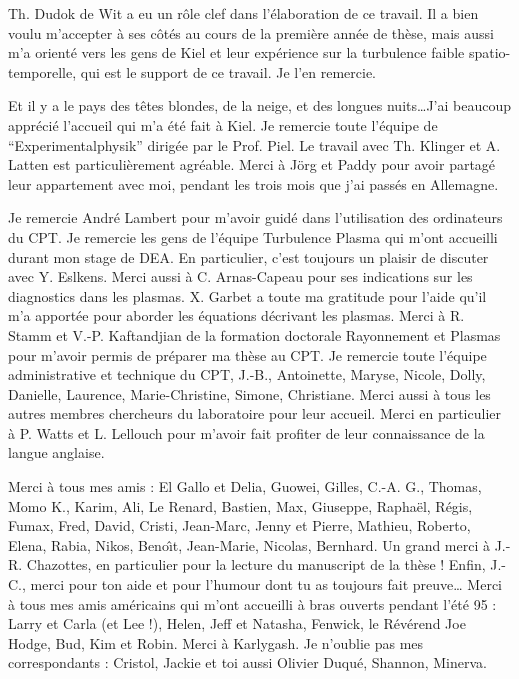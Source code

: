 \documentclass{book}
\begin{document}
Th. Dudok de Wit a eu un r\^ole clef dans l'\'elaboration de ce
travail. Il a bien voulu m'accepter \`a ses c\^ot\'es au cours de la
premi\`ere ann\'ee de th\`ese, mais aussi m'a orient\'e vers les gens
de Kiel et leur exp\'erience sur la turbulence faible
spatio-temporelle, qui est le support de ce travail. Je l'en
remercie. 

Et il y a le pays des t\^etes blondes, de la neige, et des
longues nuits\dots J'ai beaucoup appr\'eci\'e l'accueil qui m'a
\'et\'e fait \`a Kiel. Je 
remercie toute l'\'equipe de ``Experimentalphysik'' dirig\'ee par le
Prof. Piel. Le travail avec Th. Klinger et A. Latten est
particuli\`erement agr\'eable.
Merci \`a J\"org et Paddy pour avoir partag\'e leur
appartement avec moi, pendant les trois mois que j'ai pass\'es en
Allemagne. 

Je remercie Andr\'e Lambert pour m'avoir guid\'e dans
l'utilisation des ordinateurs du CPT. 
Je remercie les gens de l'\'equipe Turbulence Plasma qui m'ont
accueilli durant mon stage de DEA. En particulier, c'est toujours un
plaisir de 
discuter avec Y. Eslkens. Merci aussi \`a C. Arnas-Capeau pour ses
indications sur les diagnostics dans les plasmas.
X. Garbet a toute ma gratitude pour l'aide qu'il m'a
apport\'ee pour aborder les \'equations d\'ecrivant les plasmas.
Merci \`a R. Stamm et V.-P. Kaftandjian de la formation doctorale
Rayonnement et Plasmas pour m'avoir permis de pr\'eparer ma th\`ese au
CPT. 
Je remercie toute l'\'equipe administrative et technique du CPT,
J.-B., Antoinette, Maryse, Nicole, Dolly, Danielle, Laurence,
Marie-Christine, Simone, Christiane.
Merci aussi \`a tous les autres membres chercheurs du laboratoire pour
leur accueil. Merci en particulier \`a P. Watts et L. Lellouch pour
m'avoir fait profiter de leur connaissance de la langue anglaise.

Merci \`a tous mes amis : El Gallo et Delia, Guowei, Gilles, C.-A. G.,
Thomas, 
Momo K., Karim, Ali, Le Renard, Bastien, Max, Giuseppe, Rapha\"el,
R\'egis, Fumax, 
Fred, David, Cristi, Jean-Marc, Jenny et Pierre, Mathieu, Roberto,
Elena, Rabia, Nikos, Beno\^\i t, Jean-Marie, Nicolas, Bernhard.  Un
grand merci \`a 
J.-R. Chazottes, en particulier
pour la 
lecture du manuscript de la th\`ese !
Enfin, J.-C., merci pour ton aide et pour l'humour dont tu as toujours
fait preuve\dots
Merci \`a tous mes amis am\'ericains qui m'ont accueilli \`a bras
ouverts pendant
l'\'et\'e 95 : Larry et Carla (et Lee !), Helen, Jeff et Natasha,
Fenwick, le R\'ev\'erend Joe Hodge, Bud, Kim et Robin. Merci \`a
Karlygash. 
Je n'oublie pas mes correspondants : Cristol, Jackie et toi aussi
Olivier Duqu\'e, Shannon, Minerva.
\end{document}
